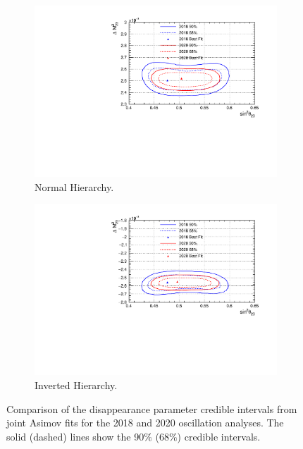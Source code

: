 \begin{figure}[!htbp]
\centering
\begin{subfigure}{.7\textwidth}
  \centering
  \includegraphics[width=0.95\linewidth]{figs/compMaCh3Contours_20182020/compMaCh3Contours_20182020_woRC_disapp_data_NH}
  \caption{Normal Hierarchy.}
  \label{fig:20182020DisNH}
\end{subfigure}
\begin{subfigure}{.7\textwidth}
  \centering
  \includegraphics[width=0.95\linewidth]{figs/compMaCh3Contours_20182020/compMaCh3Contours_20182020_woRC_disapp_data_IH}
  \caption{Inverted Hierarchy.}
  \label{fig:20182020DisIH}
\end{subfigure}
\caption{Comparison of the disappearance parameter credible intervals from joint Asimov fits for the 2018 and 2020 oscillation analyses. The solid (dashed) lines show the 90$\%$ ($68\%$) credible intervals.}
\label{fig:20182020Dis}
\end{figure}

